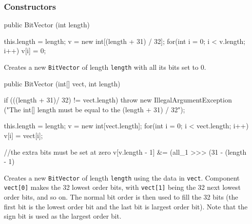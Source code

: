 \subsubsection* {Constructors}

\begin{code}
   public BitVector (int length) \begin{hide} {
      this.length = length;
      v = new int[(length + 31) / 32];
      for(int i = 0; i < v.length; i++)
         v[i] = 0;
   } \end{hide}
\end{code}
\begin{tabb} Creates a new \texttt{BitVector} of length \texttt{length} with 
  all its bits set to 0.
\end{tabb}
\begin{htmlonly}
\end{htmlonly}
\begin{code}

   public BitVector (int[] vect, int length) \begin{hide} {
      if (((length + 31)/ 32) != vect.length)
         throw new IllegalArgumentException
         ("The int[] length must be equal to the (length + 31) / 32");

      this.length = length;
      v = new int[vect.length];
      for(int i = 0; i < vect.length; i++)
         v[i] = vect[i];

      //the extra bits must be set at zero
      v[v.length - 1] &= (all_1 >>> (31 - (length - 1) %
   } \end{hide}
\end{code}
\begin{tabb} Creates a new \texttt{BitVector} of length \texttt{length} using
  the data in \texttt{vect}. Component \texttt{vect[0]} makes the 32 lowest order
  bits, 
  with \texttt{vect[1]} being the 32 next lowest order bits, and so on.
  The normal bit order is then used to fill the 32 bits (the first bit 
  is the lowest order bit and the last bit is largest order bit). 
  Note that the sign bit is used as the largest order bit.
\end{tabb}
\begin{htmlonly}
\end{htmlonly}
